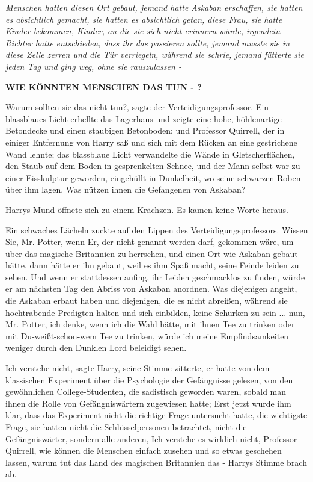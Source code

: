 \emph{Menschen hatten diesen Ort gebaut, jemand hatte Askaban erschaffen, sie
hatten es absichtlich gemacht, sie hatten es absichtlich getan, diese Frau, sie
hatte Kinder bekommen, Kinder, an die sie sich nicht erinnern würde, irgendein
Richter hatte} \emph{entschieden, dass ihr das passieren sollte, jemand musste
sie in diese Zelle zerren und die Tür verriegeln, während sie schrie, jemand
fütterte sie} \emph{jeden Tag und ging weg, ohne sie rauszulassen -}

\glqq{}\textbf{WIE KÖNNTEN MENSCHEN DAS TUN - ?}\grqq{}

\glqq{}Warum sollten sie das nicht tun?\grqq{}, sagte der Verteidigungsprofessor.
Ein blassblaues Licht erhellte das Lagerhaus und zeigte eine hohe, höhlenartige
Betondecke und einen staubigen Betonboden; und Professor Quirrell, der in
einiger Entfernung von Harry saß und sich mit dem Rücken an eine gestrichene
Wand lehnte; das blassblaue Licht verwandelte die Wände in Gletscherflächen, den
Staub auf dem Boden in gesprenkelten Schnee, und der Mann selbst war zu einer
Eisskulptur geworden, eingehüllt in Dunkelheit, wo seine schwarzen Roben über
ihm lagen. \glqq{}Was nützen ihnen die Gefangenen von Askaban?\grqq{}

Harrys Mund öffnete sich zu einem Krächzen. Es kamen keine Worte heraus.

Ein schwaches Lächeln zuckte auf den Lippen des Verteidigungsprofessors. \glqq{}
Wissen Sie, Mr. Potter, wenn Er, der nicht genannt werden darf, gekommen wäre,
um über das magische Britannien zu herrschen, und einen Ort wie Askaban gebaut
hätte, dann hätte er ihn gebaut, weil es ihm Spaß macht, seine Feinde leiden zu
sehen. Und wenn er stattdessen anfing, ihr Leiden geschmacklos zu finden, würde
er am nächsten Tag den Abriss von Askaban anordnen. Was diejenigen angeht, die
Askaban erbaut haben und diejenigen, die es nicht abreißen, während sie
hochtrabende Predigten halten und sich einbilden, keine Schurken zu sein ... nun,
Mr. Potter, ich denke, wenn ich die Wahl hätte, mit ihnen Tee zu trinken oder
mit Du-weißt-schon-wem Tee zu trinken, würde ich meine Empfindsamkeiten weniger
durch den Dunklen Lord beleidigt sehen.\grqq{}

\glqq{}Ich verstehe nicht\grqq{}, sagte Harry, seine Stimme zitterte, er hatte
von dem klassischen Experiment über die Psychologie der Gefängnisse gelesen, von
den gewöhnlichen College-Studenten, die sadistisch geworden waren, sobald man
ihnen die Rolle von Gefängniswärtern zugewiesen hatte; Erst jetzt wurde ihm
klar, dass das Experiment nicht die richtige Frage untersucht hatte, die
wichtigste Frage, sie hatten nicht die Schlüsselpersonen betrachtet, nicht die
Gefängniswärter, sondern alle anderen, \glqq{}Ich verstehe es wirklich nicht,
Professor Quirrell, wie können die Menschen einfach zusehen und so etwas
geschehen lassen, warum tut das Land des magischen Britannien das -\grqq{}
Harrys Stimme brach ab.

